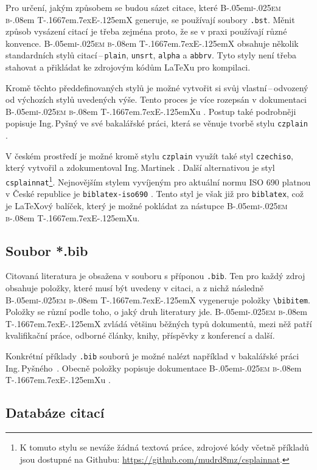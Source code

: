 \documentclass[a4paper, 11pt, final]{article}
\def\BibTeX{\textrm{B\kern-.05em\textsc{i\kern-.025em b}\kern-.08em T\kern-.1667em\lower.7ex\hbox{E}\kern-.125emX}}
\begin{document}
Pro určení, jakým způsobem se budou sázet citace, které \BibTeX{} generuje, se používají soubory \texttt{.bst}.
Měnit způsob vysázení citací je třeba zejména proto, že se v praxi používají různé konvence. \BibTeX{} obsahuje
několik standardních stylů citací\,--\,\texttt{plain}, \texttt{unsrt}, \texttt{alpha} a \texttt{abbrv}. Tyto
styly není třeba stahovat a přikládat ke zdrojovým kódům \LaTeX{}u pro kompilaci. \cite{patashnik-bibtexing}

Kromě těchto předdefinovaných stylů je možné vytvořit si svůj vlastní\,--\,odvozený od výchozích stylů
uvedených výše. Tento proces je více rozepsán v dokumentaci \BibTeX{}u \cite{patashnik-bibtexing}. Postup
také podrobněji popisuje Ing.\,Pyšný ve své bakalářské práci, která se věnuje tvorbě stylu \texttt{czplain} 
\cite{pysny-plaincz}.

V českém prostředí je možné kromě stylu \texttt{czplain} \cite{pysny-plaincz} využít také styl \texttt{czechiso},
který vytvořil a zdokumentoval Ing.\,Martinek \cite{martinek-czechiso}. Další alternativou je styl
\texttt{csplainnat}\footnote{K tomuto stylu se neváže žádná textová práce, zdrojové kódy včetně příkladů
jsou dostupné na Githubu: \url{https://github.com/mudrd8mz/csplainnat}.}. Nejnovějším stylem vyvíjeným
pro aktuální normu ISO 690 platnou v České republice je \texttt{biblatex-iso690} \cite{hoftich-biblatex-iso690}.
Tento styl je však již pro \texttt{biblatex}, což je \LaTeX{}ový balíček, který je možné pokládat za nástupce
\BibTeX{}u. \cite{cstug-zpravodaj-2016-1}

\subsection{Soubor *.bib}
\label{subsec:bib-files}

Citovaná literatura je obsažena v souboru s příponou \texttt{.bib}. Ten pro každý zdroj obsahuje položky,
které musí být uvedeny v citaci, a z nichž následně \BibTeX{} vygeneruje položky \verb|\bibitem|. Položky
se různí podle toho, o jaký druh literatury jde. \BibTeX{} zvládá většinu běžných typů dokumentů, mezi něž
patří kvalifikační práce, odborné články, knihy, příspěvky z konferencí a další.
\cite{pysny-plaincz, patashnik-bibtexing}

Konkrétní příklady \texttt{.bib} souborů je možné nalézt například v bakalářské práci Ing.\,Pyšného\ 
\cite{pysny-plaincz}. Obecně položky popisuje dokumentace \BibTeX{}u \cite{patashnik-bibtexing}.

\subsection{Databáze citací}
\end{document}
